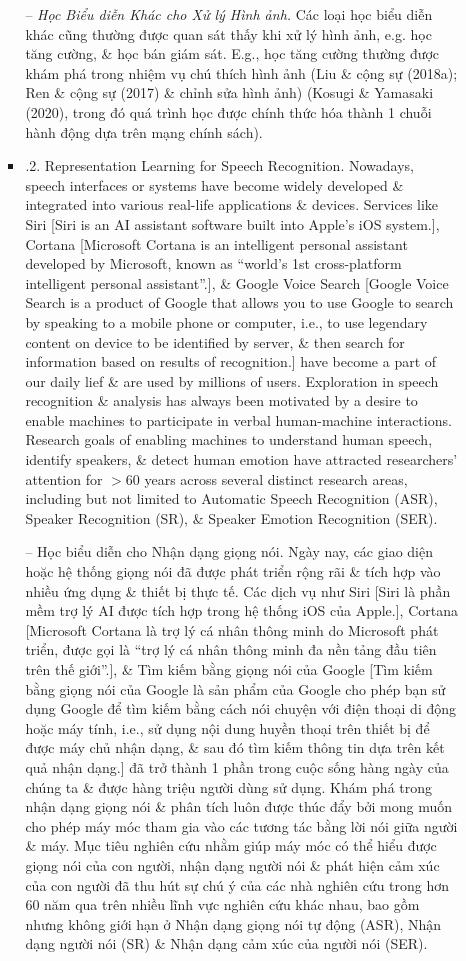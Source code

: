 \documentclass{article}
\begin{document}
\begin{itemize}
\begin{itemize}
\begin{itemize}
            -- {\it Học Biểu diễn Khác cho Xử lý Hình ảnh.} Các loại học biểu diễn khác cũng thường được quan sát thấy khi xử lý hình ảnh, e.g. học tăng cường, \& học bán giám sát. E.g., học tăng cường thường được khám phá trong nhiệm vụ chú thích hình ảnh (Liu \& cộng sự (2018a); Ren \& cộng sự (2017) \& chỉnh sửa hình ảnh) (Kosugi \& Yamasaki (2020), trong đó quá trình học được chính thức hóa thành 1 chuỗi hành động dựa trên mạng chính sách).
            \item {.2. Representation Learning for Speech Recognition.} Nowadays, speech interfaces or systems have become widely developed \& integrated into various real-life applications \& devices. Services like Siri [Siri is an AI assistant software built into Apple's iOS system.], Cortana [Microsoft Cortana is an intelligent personal assistant developed by Microsoft, known as ``world's 1st cross-platform intelligent personal assistant''.], \& Google Voice Search [Google Voice Search is a product of Google that allows you to use Google to search by speaking to a mobile phone or computer, i.e., to use legendary content on device to be identified by server, \& then search for information based on results of recognition.] have become a part of our daily lief \& are used by millions of users. Exploration in speech recognition \& analysis has always been motivated by a desire to enable machines to participate in verbal human-machine interactions. Research goals of enabling machines to understand human speech, identify speakers, \& detect human emotion have attracted researchers' attention for $> 60$ years across several distinct research areas, including but not limited to Automatic Speech Recognition (ASR), Speaker Recognition (SR), \& Speaker Emotion Recognition (SER).

            -- {\sf Học biểu diễn cho Nhận dạng giọng nói.} Ngày nay, các giao diện hoặc hệ thống giọng nói đã được phát triển rộng rãi \& tích hợp vào nhiều ứng dụng \& thiết bị thực tế. Các dịch vụ như Siri [Siri là phần mềm trợ lý AI được tích hợp trong hệ thống iOS của Apple.], Cortana [Microsoft Cortana là trợ lý cá nhân thông minh do Microsoft phát triển, được gọi là ``trợ lý cá nhân thông minh đa nền tảng đầu tiên trên thế giới''.], \& Tìm kiếm bằng giọng nói của Google [Tìm kiếm bằng giọng nói của Google là sản phẩm của Google cho phép bạn sử dụng Google để tìm kiếm bằng cách nói chuyện với điện thoại di động hoặc máy tính, i.e., sử dụng nội dung huyền thoại trên thiết bị để được máy chủ nhận dạng, \& sau đó tìm kiếm thông tin dựa trên kết quả nhận dạng.] đã trở thành 1 phần trong cuộc sống hàng ngày của chúng ta \& được hàng triệu người dùng sử dụng. Khám phá trong nhận dạng giọng nói \& phân tích luôn được thúc đẩy bởi mong muốn cho phép máy móc tham gia vào các tương tác bằng lời nói giữa người \& máy. Mục tiêu nghiên cứu nhằm giúp máy móc có thể hiểu được giọng nói của con người, nhận dạng người nói \& phát hiện cảm xúc của con người đã thu hút sự chú ý của các nhà nghiên cứu trong hơn 60 năm qua trên nhiều lĩnh vực nghiên cứu khác nhau, bao gồm nhưng không giới hạn ở Nhận dạng giọng nói tự động (ASR), Nhận dạng người nói (SR) \& Nhận dạng cảm xúc của người nói (SER).


\end{itemize}
\end{itemize}
\end{itemize}
\end{document}

